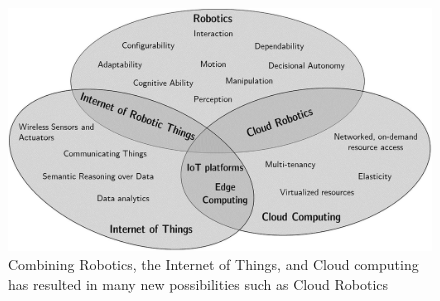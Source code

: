 \begin{figure}[b!]
    \begin{center}
        \includegraphics[width=0.8\linewidth]{figures/TradeStudy/figure3.jpg}
        \caption{Combining Robotics, the Internet of Things, and Cloud computing has resulted in many new possibilities such as Cloud Robotics~\citep{simoens_internet_2018}}
        \label{figure-hari:cloudrobotics}
    \end{center}
\end{figure}

